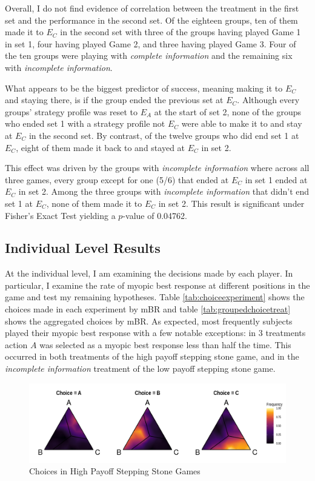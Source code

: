 Overall, I do not find evidence of correlation between the treatment in the first set and the performance in the second set. Of the eighteen groups, ten of them made it to $E_C$ in the second set with three of the groups having played Game 1 in set 1, four having played Game 2, and three having played Game 3. Four of the ten groups were playing with \textit{complete information} and the remaining six with \textit{incomplete information}. 

What appears to be the biggest predictor of success, meaning making it to $E_C$ and staying there, is if the group ended the previous set at $E_C$. Although every groups' strategy profile was reset to $E_A$ at the start of set 2, none of the groups who ended set 1 with a strategy profile not $E_C$ were able to make it to and stay at $E_C$ in the second set. By contrast, of the twelve groups who did end set 1 at $E_C$, eight of them made it back to and stayed at $E_C$ in set 2.

This effect was driven by the groups with \textit{incomplete information} where across all three games, every group except for one (5/6) that ended at $E_C$ in set 1 ended at $E_C$ in set 2. Among the three groups with \textit{incomplete information} that didn't end set 1 at $E_C$, none of them made it to $E_C$ in set 2. This result is significant under Fisher's Exact Test yielding a $p$-value of 0.04762.


\subsection{Individual Level Results}

At the individual level, I am examining the decisions made by each player. In particular, I examine the rate of myopic best response at different positions in the game and test my remaining hypotheses. Table \ref{tab:choiceexperiment} shows the choices made in each experiment by mBR and table \ref{tab:groupedchoicetreat} shows the aggregated choices by mBR. As expected, most frequently subjects played their myopic best response with a few notable exceptions: in 3 treatments action $A$ was selected as a myopic best response less than half the time. This occurred in both treatments of the high payoff stepping stone game, and in the \textit{incomplete information} treatment of the low payoff stepping stone game. 


\begin{figure}[h]
\captionsetup{justification=centering}
  \caption{Choices in High Payoff Stepping Stone Games}
   \label{fig:Game2ChoiceFreq}
    \includegraphics[width = \textwidth]{Images/Game2ChoiceFreq.png}
\end{figure}

